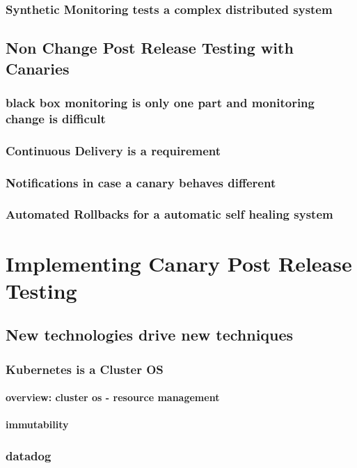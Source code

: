 \subsection{Synthetic Monitoring tests a complex distributed system}

\section{Non Change Post Release Testing with Canaries}
\subsection{black box monitoring is only one part and monitoring change is difficult}
\subsection{Continuous Delivery is a requirement}
\subsection{Notifications in case a canary behaves different}
\subsection{Automated Rollbacks for a automatic self healing system}

\chapter{Implementing Canary Post Release Testing}
\section{New technologies drive new techniques}
\subsection{Kubernetes is a Cluster OS}
\subsubsection{overview: cluster os - resource management}
\subsubsection{immutability}
\subsection{datadog}
